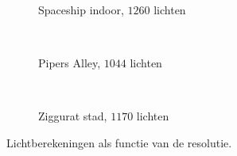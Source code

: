 \begin{figure}[t]
\begin{minipage}[t]{0.5\textwidth}
\begin{adjustbox}{minipage=\textwidth, scale=0.55}
\begin{subfigure}[b]{1.6\textwidth}
      \centering
      \def\svgwidth{\textwidth}
      
      \caption{Spaceship indoor, $1260$ lichten}
      \vspace{4pt}
      \label{fig:cs-lc-resolution:indoor}
    \end{subfigure}
  \end{adjustbox} \\
  \begin{adjustbox}{minipage=\textwidth, scale=0.55}
    \begin{subfigure}[b]{1.6\textwidth}
      \centering
      \def\svgwidth{\textwidth}
      
      \caption{Pipers Alley, $1044$ lichten}
      \vspace{4pt}
      \label{fig:cs-lc-resolution:alley}
    \end{subfigure}
  \end{adjustbox} \\
  \begin{adjustbox}{minipage=\textwidth, scale=0.55}
    \begin{subfigure}[b]{1.6\textwidth}
      \centering
      \def\svgwidth{\textwidth}
      
      \caption{Ziggurat stad, $1170$ lichten}
      \label{fig:cs-lc-resolution:city}
    \end{subfigure}
  \end{adjustbox}
  \caption{\small Lichtberekeningen als functie van de resolutie. }
  \label{fig:cs-lc-resolution}
  \end{minipage}
\end{figure}

